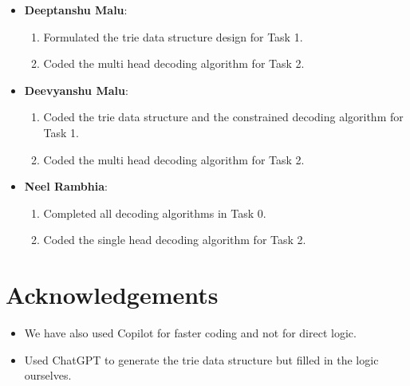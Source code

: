 \documentclass[11pt]{article}
\begin{document}
\begin{itemize}
    \item \textbf{Deeptanshu Malu}:
    \begin{enumerate}
        \item Formulated the trie data structure design for Task 1.
        \item Coded the multi head decoding algorithm for Task 2.
    \end{enumerate}

    \item \textbf{Deevyanshu Malu}:
    \begin{enumerate}
        \item Coded the trie data structure and the constrained decoding algorithm for Task 1.
        \item Coded the multi head decoding algorithm for Task 2.
    \end{enumerate}

    \item \textbf{Neel Rambhia}:
    \begin{enumerate}
        \item Completed all decoding algorithms in Task 0.
        \item Coded the single head decoding algorithm for Task 2.
    \end{enumerate}
\end{itemize}

\section*{Acknowledgements}

\begin{itemize}
    \item We have also used Copilot for faster coding and not for direct logic.
    \item Used ChatGPT to generate the trie data structure but filled in the logic ourselves.
\end{itemize}
\end{document}
